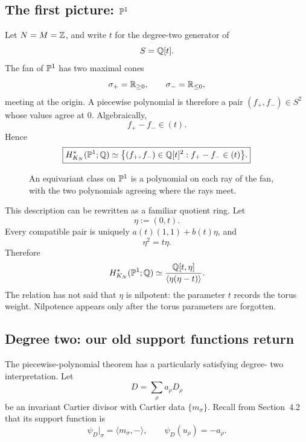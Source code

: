 \subsection{The first picture: \texorpdfstring{\(\mathbb{P}^1\)}{P1}}

Let \(N=M=\mathbb{Z}\), and write \(t\) for the degree-two generator of
\[
S=\mathbb{Q}[t].
\]
The fan of \(\mathbb{P}^1\) has two maximal cones
\[
\sigma_+=\mathbb{R}_{\ge0},
\qquad
\sigma_-=\mathbb{R}_{\le0},
\]
meeting at the origin. A piecewise polynomial is therefore a pair
\((f_+,f_-)\in S^2\) whose values agree at \(0\). Algebraically,
\[
f_+-f_-\in(t).
\]
Hence
\[
\boxed{
H_{K_N}^*(\mathbb{P}^1;\mathbb{Q})
\simeq
\bigl\{(f_+,f_-)\in\mathbb{Q}[t]^2:
f_+-f_-\in(t)\bigr\}.
}
\]

\begin{figure}[htbp]
\centering
{}
\caption{An equivariant class on \(\mathbb{P}^1\) is a polynomial on each
ray of the fan, with the two polynomials agreeing where the rays meet.}
\label{fig:p1-piecewise-polynomial}
\end{figure}

This description can be rewritten as a familiar quotient ring. Let
\[
\eta:=(0,t).
\]
Every compatible pair is uniquely \(a(t)(1,1)+b(t)\eta\), and
\[
\eta^2=t\eta.
\]
Therefore
\[
H_{K_N}^*(\mathbb{P}^1;\mathbb{Q})
\simeq
\frac{\mathbb{Q}[t,\eta]}{\langle\eta(\eta-t)\rangle}.
\]
The relation has not said that \(\eta\) is nilpotent: the parameter
\(t\) records the torus weight. Nilpotence appears only after the torus
parameters are forgotten.

\subsection{Degree two: our old support functions return}

The piecewise-polynomial theorem has a particularly satisfying degree-
two interpretation. Let
\[
D=\sum_\rho a_\rho D_\rho
\]
be an invariant Cartier divisor with Cartier data
\(\{m_\sigma\}\). Recall from Section~4.2 that its support function is
\[
\psi_D|_\sigma=\langle m_\sigma,-\rangle,
\qquad
\psi_D(u_\rho)=-a_\rho.
\]

